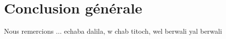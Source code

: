 
\chapter*{Conclusion générale} %

Nous remercions ... echaba dalila, w chab titoch, wel berwali yal berwali
